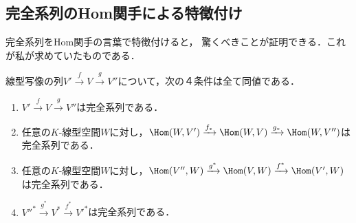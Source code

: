 \documentclass[uplatex, dvipdfmx]{jsreport}
\begin{document}
\subsection{完全系列のHom関手による特徴付け}

\begin{tcolorbox}[colframe=ForestGreen, colback=ForestGreen!10!white,breakable,colbacktitle=ForestGreen!40!white,coltitle=black,fonttitle=\bfseries\sffamily,
title=]
    完全系列をHom関手の言葉で特徴付けると，
    驚くべきことが証明できる．これが私が求めていたものである．
\end{tcolorbox}

\begin{proposition}[完全系列の普遍性]\label{proposition-universality-of-exact-sequence}
    線型写像の列$V'\xrightarrow{f}V\xrightarrow{g}V''$について，次の４条件は全て同値である．
    \begin{enumerate}
        \item $V'\xrightarrow{f}V\xrightarrow{g}V''$は完全系列である．
        \item 任意の$K$-線型空間$W$に対し，$\Hom(W,V')\xrightarrow{f_*}\Hom(W,V)\xrightarrow{g_*}\Hom(W,V'')$は完全系列である．
        \item 任意の$K$-線型空間$W$に対し，$\Hom(V'',W)\xrightarrow{g^*}\Hom(V,W)\xrightarrow{f^*}\Hom(V',W)$は完全系列である．
        \item $V''^*\xrightarrow{g^*}V^*\xrightarrow{f^*}V'^*$は完全系列である．
    \end{enumerate}
\end{proposition}
\end{document}
